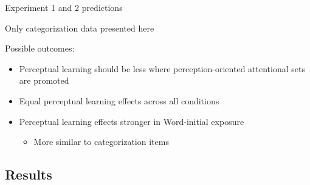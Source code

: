 \documentclass{beamer}
\begin{document}
\begin{frame}{Experiment 1 and 2 predictions}

Only categorization data presented here

Possible outcomes:
\begin{itemize}
\item Perceptual learning should be less where perception-oriented attentional sets are promoted
\item Equal perceptual learning effects across all conditions
\item Perceptual learning effects stronger in Word-initial exposure
\begin{itemize}
\item More similar to categorization items
\end{itemize}
\end{itemize}
\end{frame}

\subsection{Results}
\end{document}

